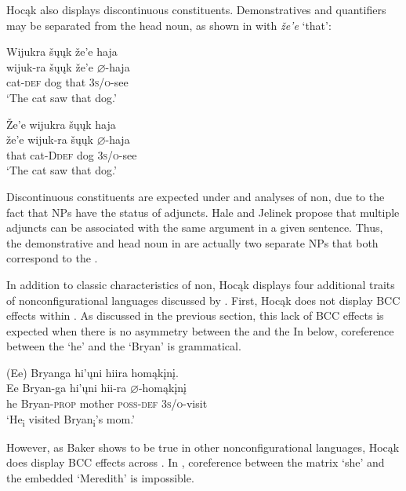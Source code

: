\documentclass[output=paper]{LSP/langsci}
\begin{document}
Hocąk also displays discontinuous constituents. Demonstratives and quantifiers may be separated from the head noun, as shown in  with \textit{\v{z}e'e} `that': 

\ea\label{ex:jrs:15}
\ea \label{ex:jrs:15a}
\glll Wijukra	\v{s}\k{u}\k{u}k	\v{z}e'e	haja \\
wijuk-ra	\v{s}\k{u}\k{u}k	\v{z}e'e	$\varnothing$-haja \\
	cat-\textsc{def} 	dog	that		\textsc{3s/o}-see\\
\trans `The cat saw that dog.' 

\ex \label{ex:jrs:15b}
\glll \v{Z}e'e	wijukra	 \v{s}\k{u}\k{u}k	haja \\
\v{z}e'e	wijuk-ra	\v{s}\k{u}\k{u}k	$\varnothing$-haja \\
that cat-D\textsc{def} dog \textsc{3s/o}-see \\
\trans `The cat saw that dog.'
\z 
\z 

Discontinuous constituents are expected under  and  analyses of non, due to the fact that NPs have the status of adjuncts. Hale and Jelinek propose that multiple adjuncts can be associated with the same argument in a given sentence. Thus, the demonstrative and head noun in  are actually two separate NPs that both correspond to the .

In addition to  classic characteristics of non, Hocąk displays four additional traits of nonconfigurational languages discussed by \citet{Baker1996}. First, Hocąk does not display BCC effects within .  As discussed in the previous section, this lack of BCC effects is expected when there is no asymmetry between the  and the  In  below, coreference between the  `he' and the  `Bryan' is grammatical.

\begin{exe}
\ex\label{ex:jrs:16}	
\glll (Ee) 	Bryanga 			hi'\k{u}ni 	hiira 				homąk\k{i}n\k{i}. \\
Ee 		Bryan-ga 		hi'\k{u}ni 	hii-ra 			$\varnothing$-homąk\k{i}n\k{i} \\
he 		Bryan-\textsc{prop} mother 	\textsc{poss-def} 	\textsc{3s/o}-visit  \\
\trans `He\textsubscript{i} visited Bryan\textsubscript{i}'s mom.'
\end{exe}
However, as Baker shows to be true in other nonconfigurational languages, Hocąk does display BCC effects across . In , coreference between the matrix  `she' and the embedded  `Meredith' is impossible.
\end{document}
